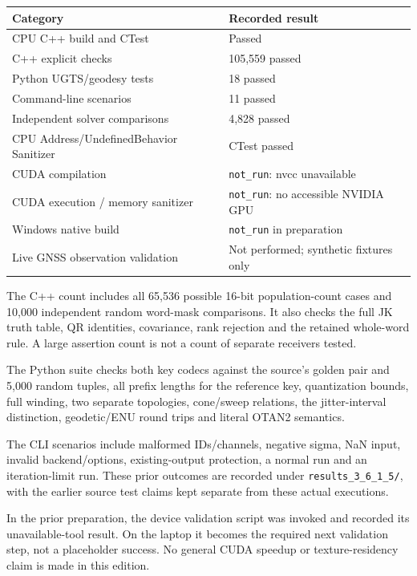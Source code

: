 \documentclass[11pt,a4paper]{article}
\newcommand{\code}[1]{\texttt{#1}}
\begin{document}
\begin{center}
\begin{tabularx}{\textwidth}{@{}P{.48\textwidth}Y@{}}\toprule
\textbf{Category} & \textbf{Recorded result}\\\midrule
CPU C++ build and CTest & Passed\\
C++ explicit checks & 105,559 passed\\
Python UGTS/geodesy tests & 18 passed\\
Command-line scenarios & 11 passed\\
Independent solver comparisons & 4,828 passed\\
CPU Address/UndefinedBehavior Sanitizer & CTest passed\\
CUDA compilation & \code{not\_run}: nvcc unavailable\\
CUDA execution / memory sanitizer & \code{not\_run}: no accessible NVIDIA GPU\\
Windows native build & \code{not\_run} in preparation\\
Live GNSS observation validation & Not performed; synthetic fixtures only\\\bottomrule
\end{tabularx}
\end{center}

The C++ count includes all 65,536 possible 16-bit population-count cases and 10,000
independent random word-mask comparisons. It also checks the full JK truth table,
QR identities, covariance, rank rejection and the retained whole-word rule. A large
assertion count is not a count of separate receivers tested.

The Python suite checks both key codecs against the source's golden pair and 5,000
random tuples, all prefix lengths for the reference key, quantization bounds, full
winding, two separate topologies, cone/sweep relations, the jitter-interval distinction,
geodetic/ENU round trips and literal OTAN2 semantics.

The CLI scenarios include malformed IDs/channels, negative sigma, NaN input, invalid
backend/options, existing-output protection, a normal run and an iteration-limit run.
These prior outcomes are recorded under \code{results\_3\_6\_1\_5/}, with the earlier source test claims
kept separate from these actual executions.

In the prior preparation, the device validation script was invoked and recorded
its unavailable-tool result. On the laptop it becomes the required next validation step,
not a placeholder success. No general CUDA speedup or texture-residency claim is made
in this edition.
\clearpage
\end{document}
